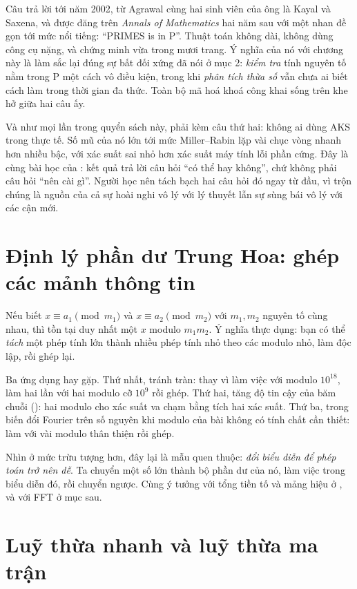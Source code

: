 \documentclass[../../algorithm.tex]{subfiles}
\begin{document}
Câu trả lời tới năm 2002, từ Agrawal cùng hai sinh viên của ông là Kayal và Saxena, và được đăng trên \emph{Annals of Mathematics} hai năm sau\cite{aks2004} với một nhan đề gọn tới mức nổi tiếng: ``PRIMES is in P''. Thuật toán không dài, không dùng công cụ nặng, và chứng minh vừa trong mươi trang. Ý nghĩa của nó với chương này là làm sắc lại đúng sự bất đối xứng đã nói ở mục 2: \emph{kiểm tra} tính nguyên tố nằm trong P một cách vô điều kiện, trong khi \emph{phân tích thừa số} vẫn chưa ai biết cách làm trong thời gian đa thức. Toàn bộ mã hoá khoá công khai sống trên khe hở giữa hai câu ấy.

Và như mọi lần trong quyển sách này, phải kèm câu thứ hai: không ai dùng AKS trong thực tế. Số mũ của nó lớn tới mức Miller--Rabin lặp vài chục vòng nhanh hơn nhiều bậc, với xác suất sai nhỏ hơn xác suất máy tính lỗi phần cứng. Đây là cùng bài học của : kết quả trả lời câu hỏi ``có thể hay không'', chứ không phải câu hỏi ``nên cài gì''. Người học nên tách bạch hai câu hỏi đó ngay từ đầu, vì trộn chúng là nguồn của cả sự hoài nghi vô lý với lý thuyết lẫn sự sùng bái vô lý với các cận mới.

\section{Định lý phần dư Trung Hoa: ghép các mảnh thông tin}

Nếu biết \(x \equiv a_1 \pmod{m_1}\) và \(x \equiv a_2 \pmod{m_2}\) với \(m_1, m_2\) nguyên tố cùng nhau, thì tồn tại duy nhất một \(x\) modulo \(m_1m_2\). Ý nghĩa thực dụng: bạn có thể \emph{tách} một phép tính lớn thành nhiều phép tính nhỏ theo các modulo nhỏ, làm độc lập, rồi ghép lại.

Ba ứng dụng hay gặp. Thứ nhất, tránh tràn: thay vì làm việc với modulo \(10^{18}\), làm hai lần với hai modulo cỡ \(10^9\) rồi ghép. Thứ hai, tăng độ tin cậy của băm chuỗi (): hai modulo cho xác suất va chạm bằng tích hai xác suất. Thứ ba, trong biến đổi Fourier trên số nguyên khi modulo của bài không có tính chất cần thiết: làm với vài modulo thân thiện rồi ghép.

Nhìn ở mức trừu tượng hơn, đây lại là mẫu quen thuộc: \emph{đổi biểu diễn để phép toán trở nên dễ}. Ta chuyển một số lớn thành bộ phần dư của nó, làm việc trong biểu diễn đó, rồi chuyển ngược. Cùng ý tưởng với tổng tiền tố và mảng hiệu ở , và với FFT ở mục sau.

\section{Luỹ thừa nhanh và luỹ thừa ma trận}
\end{document}

